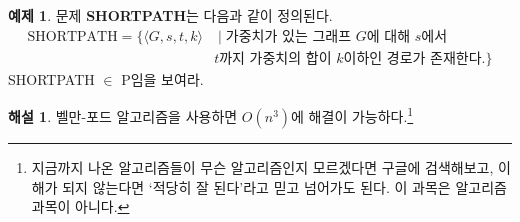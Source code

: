 \documentclass[b5paper, 11pt]{book}
\theoremstyle{definition}
\newtheorem{ex}[defn]{예제}
\newtheorem*{ans*}{해설}
\begin{document}
\begin{ex}
    문제 \textbf{SHORTPATH}는 다음과 같이 정의된다.
    \begin{align*}
        \text{SHORTPATH} = \{ \langle G,s, t, k \rangle & \;\vert\; \text{가중치가 있는 그래프 }
          G \text{에 대해 } s \text{에서 } \\ 
        & t \text{까지 가중치의 합이 } k \text{이하인 경로가 존재한다.} \}
    \end{align*}
    SHORTPATH $\in $ P임을 보여라.
\end{ex}
\begin{ans*}
    벨만-포드 알고리즘을 사용하면 $O(n^3)$에 해결이 가능하다.\footnote{지금까지 나온 알고리즘들이 무슨 알고리즘인지 모르겠다면 구글에 검색해보고, 이해가 되지 않는다면 `적당히 잘 된다'라고 믿고 넘어가도 된다. 이 과목은 알고리즘 과목이 아니다.}
\end{ans*}
\end{document}
